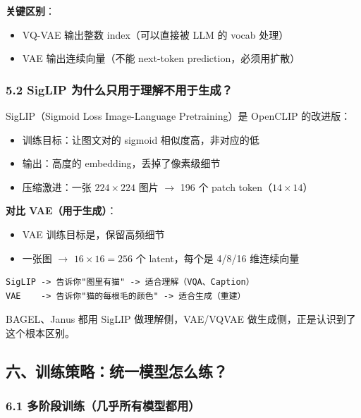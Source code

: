 \begin{conceptbox}
\textbf{关键区别}：
\begin{itemize}
  \item VQ-VAE 输出整数 index（可以直接被 LLM 的 vocab 处理）
  \item VAE 输出连续向量（不能 next-token prediction，必须用扩散）
\end{itemize}
\end{conceptbox}

\subsubsection{5.2 SigLIP 为什么只用于理解不用于生成？}

SigLIP（Sigmoid Loss Image-Language Pretraining）是 OpenCLIP 的改进版：
\begin{itemize}
  \item 训练目标：让图文对的 sigmoid 相似度高，非对应的低
  \item 输出：高度的 embedding，丢掉了像素级细节
  \item 压缩激进：一张 $224\times224$ 图片 $\to$ 196 个 patch token（$14\times14$）
\end{itemize}

\textbf{对比 VAE（用于生成）}：
\begin{itemize}
  \item VAE 训练目标是，保留高频细节
  \item 一张图 $\to$ $16\times16 = 256$ 个 latent，每个是 4/8/16 维连续向量
\end{itemize}

\begin{lstlisting}
SigLIP -> 告诉你"图里有猫" -> 适合理解（VQA、Caption）
VAE    -> 告诉你"猫的每根毛的颜色" -> 适合生成（重建）
\end{lstlisting}

\begin{summarybox}
BAGEL、Janus 都用 SigLIP 做理解侧，VAE/VQVAE 做生成侧，正是认识到了这个根本区别。
\end{summarybox}

\subsection{六、训练策略：统一模型怎么练？}

\subsubsection{6.1 多阶段训练（几乎所有模型都用）}

